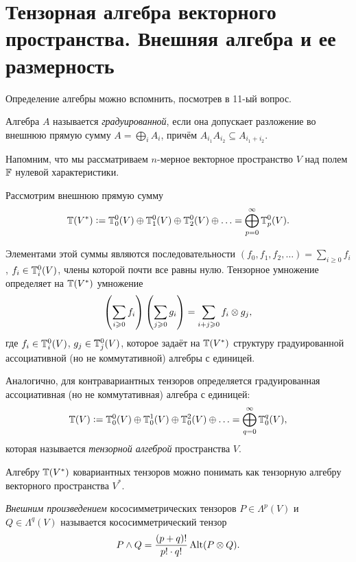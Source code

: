 \section{Тензорная алгебра векторного пространства. Внешняя алгебра и ее размерность}

Определение алгебры можно вспомнить, посмотрев в 11-ый вопрос.

\begin{definition}
    Алгебра $A$ называется \textit{градуированной}, если она допускает разложение во внешнюю прямую сумму $A = \bigoplus\limits_iA_i$, причём $A_{i_1}A_{i_2} \subseteq A_{i_1 + i_2}$.
\end{definition}

Напомним, что мы рассматриваем $n$-мерное векторное пространство $V$ над полем $\mathbb{F}$ нулевой характеристики.

Рассмотрим внешнюю прямую сумму
\[
    \mathbb{T}(V^\ast) \vcentcolon = \mathbb{T}_0^0(V) \oplus \mathbb{T}_1^0(V) \oplus \mathbb{T}_2^0(V) \oplus \ldots = \bigoplus_{p = 0}^\infty\mathbb{T}_p^0(V).
\]

Элементами этой суммы являются последовательности $(f_0, f_1, f_2, \ldots) = \sum_{i \geqslant 0}f_i$, $f_i \in \mathbb{T}_i^0(V)$, члены которой почти все равны нулю. Тензорное умножение определяет на $\mathbb{T}(V^\ast)$ умножение
\[
    \left(\sum_{i \geqslant 0}f_i\right)\left(\sum_{j \geqslant 0}g_i\right) = \sum_{i + j \geqslant 0}f_i \otimes g_j,
\]
где $f_i \in \mathbb{T}_i^0(V)$, $g_j \in \mathbb{T}_j^0(V)$, которое задаёт на $\mathbb{T}(V^\ast)$ структуру градуированной ассоциативной (но не коммутативной) алгебры с единицей.

\begin{definition}
    Аналогично, для контравариантных тензоров определяется градуированная ассоциативная (но не коммутативная) алгебра с единицей:
    \[
        \mathbb{T}(V) \vcentcolon = \mathbb{T}_0^0(V) \oplus \mathbb{T}_0^1(V) \oplus \mathbb{T}_0^2(V) \oplus \ldots = \bigoplus_{q = 0}^\infty\mathbb{T}_0^q(V),
    \]
    которая называется \textit{тензорной алгеброй} пространства $V$.
\end{definition}

Алгебру $\mathbb{T}(V^\ast)$ ковариантных тензоров можно понимать как тензорную алгебру векторного пространства $V^\ast$.

\begin{definition}
    \textit{Внешним произведением} кососимметрических тензоров $P \in \Lambda^p(V)$ и $Q \in \Lambda^q(V)$ называется кососимметрический тензор
    \[
        P \wedge Q = \frac{(p + q)!}{p! \cdot q!}\operatorname{Alt}(P \otimes Q).
    \]
\end{definition}

